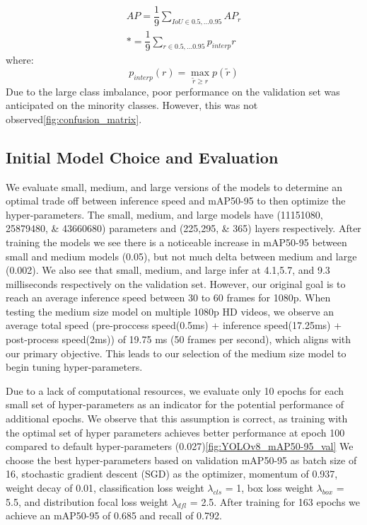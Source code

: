 \documentclass[10pt,twocolumn,letterpaper]{article}
\begin{document}
\begin{align}\label{mAP}
AP=\dfrac{1}{9}\sum_{IoU\in{0.5,...0.95}}AP_r \\*
=\dfrac{1}{9}\sum_{r\in{0.5,...0.95}}p_{interp}{r}
\end{align}
where:
\begin{equation*}
p_{interp}({r}) = \max_{\widetilde{r}\geq{r}} p(\widetilde{r})
\end{equation*}
Due to the large class imbalance, poor performance on the validation set was anticipated on the minority classes. However, this was not observed\ref{fig:confusion_matrix}.

\subsection{Initial Model Choice and Evaluation}

We evaluate small, medium, and large versions of the models to determine an optimal trade off between inference speed and mAP50-95 to then optimize the hyper-parameters. The small, medium, and large models have (11151080, 25879480, \& 43660680) parameters and (225,295, \& 365) layers respectively. After training the models we see there is a noticeable increase in mAP50-95 between small and medium models (0.05), but not much delta between medium and large (0.002). We also see that small, medium, and large infer at 4.1,5.7, and 9.3 milliseconds respectively on the validation set. However, our original goal is to reach an average inference speed between 30 to 60 frames for 1080p. When testing the medium size model on multiple 1080p HD videos, we observe an average total speed (pre-proccess speed(0.5ms) + inference speed(17.25ms) + post-process speed(2ms)) of 19.75 ms (50 frames per second), which aligns with our primary objective. This leads to our selection of the medium size model to begin tuning hyper-parameters.

Due to a lack of computational resources, we evaluate only 10 epochs for each small set of hyper-parameters as an indicator for the potential performance of additional epochs. We observe that this assumption is correct, as training with the optimal set of hyper parameters achieves better performance at epoch 100 compared to default hyper-parameters (0.027)\ref{fig:YOLOv8_mAP50-95_val} We choose the best hyper-parameters based on validation mAP50-95 as batch size of 16, stochastic gradient descent (SGD) as the optimizer, momentum of 0.937, weight decay of 0.01, classification loss weight $\lambda_{cls}$ = 1, box loss weight $\lambda_{box}$ = 5.5, and distribution focal loss weight $\lambda_{dfl}$ = 2.5. After training for 163 epochs we achieve an mAP50-95 of 0.685 and recall of 0.792.
\end{document}
